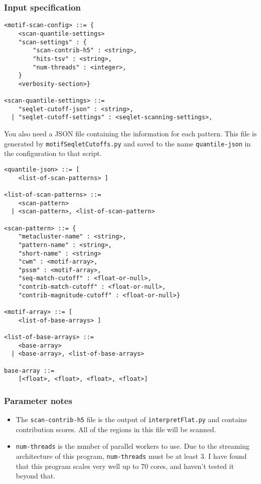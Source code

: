 \documentclass{article}
\begin{document}
\subsubsection{Input specification}

\begin{lstlisting}
<motif-scan-config> ::= {
    <scan-quantile-settings>
    "scan-settings" : {
        "scan-contrib-h5" : <string>,
        "hits-tsv" : <string>,
        "num-threads" : <integer>,
    }
    <verbosity-section>}

<scan-quantile-settings> ::=
    "seqlet-cutoff-json" : <string>,
  | "seqlet-cutoff-settings" : <seqlet-scanning-settings>,
\end{lstlisting}

You also need a JSON file containing the information for each pattern.
This file is generated by \texttt{motifSeqletCutoffs.py} and saved to the name
\texttt{quantile-json} in the configuration to that script.

\begin{lstlisting}
<quantile-json> ::= [
    <list-of-scan-patterns> ]

<list-of-scan-patterns> ::=
    <scan-pattern>
  | <scan-pattern>, <list-of-scan-pattern>

<scan-pattern> ::= {
    "metacluster-name" : <string>,
    "pattern-name" : <string>,
    "short-name" : <string>
    "cwm" : <motif-array>,
    "pssm" : <motif-array>,
    "seq-match-cutoff" : <float-or-null>,
    "contrib-match-cutoff" : <float-or-null>,
    "contrib-magnitude-cutoff" : <float-or-null>}

<motif-array> ::= [
    <list-of-base-arrays> ]

<list-of-base-arrays> ::=
    <base-array>
  | <base-array>, <list-of-base-arrays>

base-array ::=
    [<float>, <float>, <float>, <float>]
\end{lstlisting}


\subsubsection{Parameter notes}
\begin{itemize}
    \item The \texttt{scan-contrib-h5} file is the output of \texttt{interpretFlat.py}
        and contains contribution scores.
        All of the regions in this file will be scanned.
    \item \texttt{num-threads} is the number of parallel workers to use.
        Due to the streaming architecture of this program, \texttt{num-threads}
        must be at least 3.
        I have found that this program scales very well up to 70 cores,
        and haven't tested it beyond that.
\end{itemize}
\end{document}
